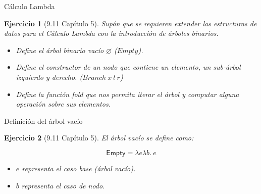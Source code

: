 \documentclass[11pt]{beamer}
\newtheorem{exercise}{Ejercicio}
\begin{document}
\begin{frame}{Cálculo Lambda}
	\begin{exercise}[9.11 Capítulo 5]
		Supón que se requieren extender las estructuras de datos para el Cálculo Lambda con la introducción de árboles binarios.\\ [1.2em]
		\begin{itemize}
			\item Define el árbol binario vacío $\varnothing$ ($Empty$). \\ [0.8em]
			\item Define el constructor de un nodo que contiene un elemento, un sub-árbol izquierdo y derecho. ($Branch\ x\ l\ r$) \\ [0.8em]
			\item Define la función \textsf{fold} que nos permita iterar el árbol y computar alguna operación sobre sus elementos.
		\end{itemize}
	\end{exercise}	
\end{frame}



\begin{frame}{Definición del árbol vacío}
	\begin{exercise}[9.11 Capítulo 5]
		El árbol vacío se define como:
		
		\[
		\textsf{Empty} = \lambda e\lambda b.\ e
		\]
		
		\begin{itemize}
			\item $e$ representa el caso base (árbol vacío).
			\item $b$ representa el caso de nodo.
		\end{itemize}
		
	\end{exercise}
\end{frame}
\end{document}

